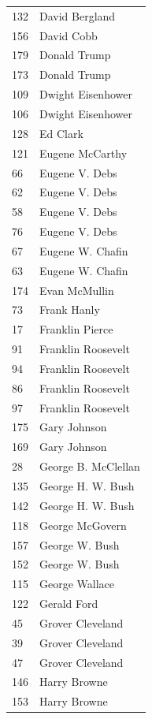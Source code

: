 \documentclass[
  letterpaper,
  DIV=11,
  numbers=noendperiod]{scrreprt}
\begin{document}
\begin{tabular}{ll}
132 &          David Bergland \\
156 &              David Cobb \\
179 &            Donald Trump \\
173 &            Donald Trump \\
109 &       Dwight Eisenhower \\
106 &       Dwight Eisenhower \\
128 &                Ed Clark \\
121 &         Eugene McCarthy \\
66  &          Eugene V. Debs \\
62  &          Eugene V. Debs \\
58  &          Eugene V. Debs \\
76  &          Eugene V. Debs \\
67  &        Eugene W. Chafin \\
63  &        Eugene W. Chafin \\
174 &           Evan McMullin \\
73  &             Frank Hanly \\
17  &         Franklin Pierce \\
91  &      Franklin Roosevelt \\
94  &      Franklin Roosevelt \\
86  &      Franklin Roosevelt \\
97  &      Franklin Roosevelt \\
175 &            Gary Johnson \\
169 &            Gary Johnson \\
28  &     George B. McClellan \\
135 &       George H. W. Bush \\
142 &       George H. W. Bush \\
118 &         George McGovern \\
157 &          George W. Bush \\
152 &          George W. Bush \\
115 &          George Wallace \\
122 &             Gerald Ford \\
45  &        Grover Cleveland \\
39  &        Grover Cleveland \\
47  &        Grover Cleveland \\
146 &            Harry Browne \\
153 &            Harry Browne \\

\end{tabular}
\end{document}
